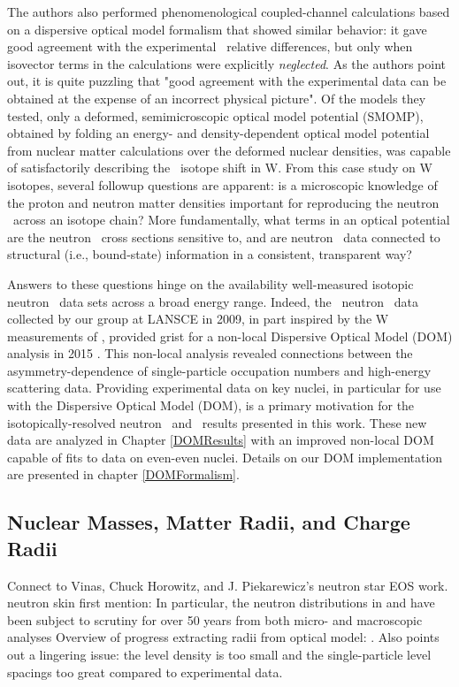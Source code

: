 The authors also performed phenomenological coupled-channel calculations
based on a dispersive optical model formalism
\cite{Mahaux1991} that showed similar behavior: it gave good agreement with the
experimental \tot\ relative differences, but only when isovector terms in the calculations
were explicitly \textit{neglected}. As the
authors point out, it is quite puzzling that "good agreement with the
experimental data can be obtained at the expense of an incorrect physical picture".
Of the models they tested, only a deformed, semimicroscopic
optical model potential (SMOMP),
obtained by folding an energy- and density-dependent optical model potential from nuclear matter 
calculations over the deformed nuclear densities, was capable of satisfactorily describing the
\tot\ isotope shift in W. From this case study on W isotopes, several followup questions
are apparent: is a microscopic knowledge of the proton and neutron matter
densities important for reproducing the neutron \tot\ across an isotope
chain? More fundamentally, what terms in an optical potential are the neutron
\tot\ cross sections sensitive to, and are neutron \tot\ data connected to
structural (i.e., bound-state) information in a consistent, transparent way?

Answers to these questions hinge on the availability well-measured 
isotopic neutron \tot\ data sets across a broad energy range. Indeed, the
\caAughtEight\ neutron \tot\ data collected by our group at LANSCE in 2009, in
part inspired by the W measurements of \cite{Dietrich2003},
provided grist for a non-local Dispersive Optical Model (DOM) analysis in 2015
\cite{MahzoonPhDThesis}. This non-local analysis revealed connections
between the asymmetry-dependence of single-particle occupation numbers
and high-energy scattering data.
Providing experimental data on key nuclei, in particular for use with the Dispersive Optical Model
(DOM), is a primary motivation for the isotopically-resolved neutron \tot\ and \el\
results presented in this work. These new data are analyzed in Chapter \ref{DOMResults} 
with an improved non-local DOM capable of fits to data on even-even nuclei. Details on our DOM
implementation are presented in chapter \ref{DOMFormalism}. 

\subsection{Nuclear Masses, Matter Radii, and Charge Radii}
Connect to Vinas, Chuck Horowitz, and J. Piekarewicz's neutron star EOS work.
neutron skin first mention: \cite{Wilkinson1967}
In particular, the neutron distributions in \caAughtEight and \pbEight have been
subject to scrutiny for over 50 years from both micro- and macroscopic analyses
Overview of progress extracting radii from optical model: \cite{Jackson1974}.
Also points out a lingering issue: the level density is too small and the
single-particle level spacings too great compared to experimental data.

